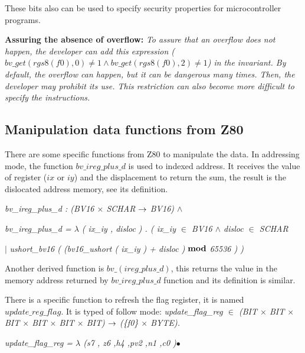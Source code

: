 \documentclass[11pt]{article} %
\begin{document}
These bits also can be used to specify security properties for microcontroller programs.   

\textbf{Assuring the absence of overflow:}
 \emph{To assure that an overflow does not happen, the developer can add this
 expression ($\mathit{bv\_get(rgs8(f0),0)} \neq 1 \land
 \mathit{bv\_get(rgs8(f0),2) \neq 1}$) in the invariant. By default, the overflow
 can happen, but it can be dangerous many times. Then, the developer may
 prohibit its use. This restriction can also become more difficult to specify
 the instructions.}



\subsection{Manipulation data functions from Z80}
 There are some specific functions
from Z80 to manipulate the data. In addressing mode, the function
$\mathit{bv\_ireg\_plus\_d}$ is  used to indexed address. It receives the value
of register ($\mathit{ix}$ or $\mathit{iy}$) and the displacement to return the
sum, the result is the dislocated address memory, see its definition.

\hspace*{0.0in}\it bv\_ireg\_plus\_d \rm : \rm(\it BV16  $\times$  \it SCHAR  $\fun$  \it BV16\rm )  $\land$ 

\hspace*{0.0in}\it bv\_ireg\_plus\_d \rm =  $\lambda$  \rm ( \it ix\_iy \rm , \it disloc \rm ) \rm . \rm ( \it ix\_iy  $\in$  \it BV16  $\land$  \it disloc  $\in$  \it SCHAR   

\hspace*{0.20in}$\mid$ \it ushort\_bv16 \rm ( \rm (\it bv16\_ushort \rm ( \it ix\_iy \rm ) \rm + \it disloc \rm ) 
$\mod$ \rm 6\rm 5\rm 5\rm 3\rm 6 \rm ) \rm )

Another derived function is  $\mathit{bv\_(ireg\_plus\_d)}$, this returns the value in the memory  address
returned by $\mathit{bv\_ireg\_plus\_d}$ function and its definition is similar.

There is a specific function to refresh the flag register, it is named $\mathit{update\_reg\_flag}$. It is typed of
follow mode: \it update\_flag\_reg \rm $\in$ \rm (\it BIT  $\times$  \it BIT  $\times$  \it BIT  $\times$  \it
BIT $\times$  \it BIT  $\times$  \it BIT\rm) $\fun$  \rm (\rm \{\it f0\rm \}  $\times$  \it BYTE\rm ). 

\it update\_flag\_reg \rm =  $\lambda$  \rm (\it s7 \rm, \it z6 \rm,\it h4 \rm,\it pv2 \rm ,\it n1
\rm ,\it c0 \rm)$\bullet$
\end{document}
